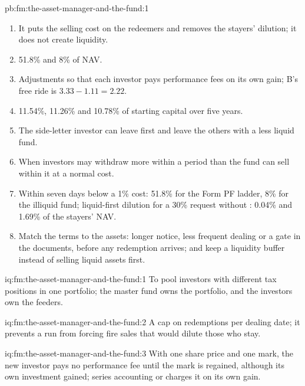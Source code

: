 \begin{solution}{pb:fm:the-asset-manager-and-the-fund:1}
\begin{enumerate}
\item It puts the selling cost on the redeemers and removes the stayers' dilution; it does not create liquidity.
\item 51.8\% and 8\% of NAV.
\item Adjustments so that each investor pays performance fees on its own gain; B's free ride is $3.33-1.11=2.22$.
\item 11.54\%, 11.26\% and 10.78\% of starting capital over five years.
\item The side-letter investor can leave first and leave the others with a less liquid fund.
\item When investors may withdraw more within a period than the fund can sell within it at a normal cost.
\item Within seven days below a 1\% cost: 51.8\% for the Form PF ladder, 8\% for the illiquid fund; liquid-first dilution for a 30\% request
without : 0.04\% and 1.69\% of the stayers' NAV.
\item Match the terms to the assets: longer notice, less frequent dealing or a gate in the documents, before any redemption arrives; and keep a
liquidity buffer instead of selling liquid assets first.
\end{enumerate}
\end{solution}

\begin{solution}{iq:fm:the-asset-manager-and-the-fund:1}
To pool investors with different tax positions in one portfolio; the master fund owns the portfolio, and the investors own the feeders.
\end{solution}

\begin{solution}{iq:fm:the-asset-manager-and-the-fund:2}
A cap on redemptions per dealing date; it prevents a run from forcing fire sales that would dilute those who stay.
\end{solution}

\begin{solution}{iq:fm:the-asset-manager-and-the-fund:3}
With one share price and one mark, the new investor pays no performance fee until the mark is regained, although its own investment gained;
series accounting or  charges it on its own gain.
\end{solution}

